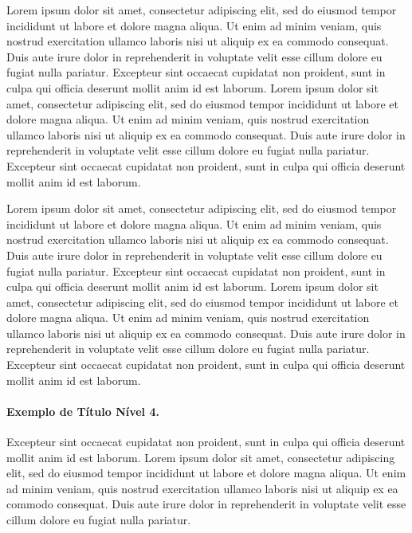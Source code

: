 \documentclass[portuguese]{sbc2025}%
\begin{document}
Lorem ipsum dolor sit amet, consectetur adipiscing elit, sed do eiusmod tempor incididunt ut labore et dolore magna aliqua. Ut enim ad minim veniam, quis nostrud exercitation ullamco laboris nisi ut aliquip ex ea commodo consequat. Duis aute irure dolor in reprehenderit in voluptate velit esse cillum dolore eu fugiat nulla pariatur. Excepteur sint occaecat cupidatat non proident, sunt in culpa qui officia deserunt mollit anim id est laborum. Lorem ipsum dolor sit amet, consectetur adipiscing elit, sed do eiusmod tempor incididunt ut labore et dolore magna aliqua. Ut enim ad minim veniam, quis nostrud exercitation ullamco laboris nisi ut aliquip ex ea commodo consequat. Duis aute irure dolor in reprehenderit in voluptate velit esse cillum dolore eu fugiat nulla pariatur. Excepteur sint occaecat cupidatat non proident, sunt in culpa qui officia deserunt mollit anim id est laborum.

Lorem ipsum dolor sit amet, consectetur adipiscing elit, sed do eiusmod tempor incididunt ut labore et dolore magna aliqua. Ut enim ad minim veniam, quis nostrud exercitation ullamco laboris nisi ut aliquip ex ea commodo consequat. Duis aute irure dolor in reprehenderit in voluptate velit esse cillum dolore eu fugiat nulla pariatur. Excepteur sint occaecat cupidatat non proident, sunt in culpa qui officia deserunt mollit anim id est laborum. Lorem ipsum dolor sit amet, consectetur adipiscing elit, sed do eiusmod tempor incididunt ut labore et dolore magna aliqua. Ut enim ad minim veniam, quis nostrud exercitation ullamco laboris nisi ut aliquip ex ea commodo consequat. Duis aute irure dolor in reprehenderit in voluptate velit esse cillum dolore eu fugiat nulla pariatur. Excepteur sint occaecat cupidatat non proident, sunt in culpa qui officia deserunt mollit anim id est laborum.



\paragraph{Exemplo de Título Nível 4.}

Excepteur sint occaecat cupidatat non proident, sunt in culpa qui officia deserunt mollit anim id est laborum. Lorem ipsum dolor sit amet, consectetur adipiscing elit, sed do eiusmod tempor incididunt ut labore et dolore magna aliqua. Ut enim ad minim veniam, quis nostrud exercitation ullamco laboris nisi ut aliquip ex ea commodo consequat. Duis aute irure dolor in reprehenderit in voluptate velit esse cillum dolore eu fugiat nulla pariatur. 
\end{document}
